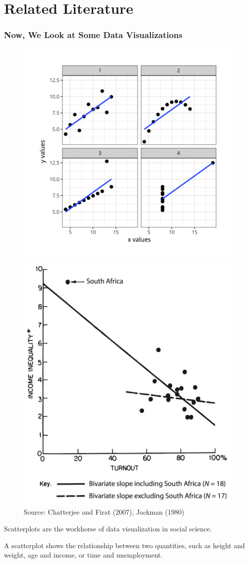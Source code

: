 \documentclass[11pt]{beamer}
\begin{document}
	\section[Literature]{Related Literature}
\begin{frame}

	\frametitle{\bfseries Now, We Look at Some Data Visualizations}
	\begin{figure}
		\vspace{-.5em}
		\includegraphics[width=0.5\linewidth]{Figure/anscombe-1}
		\includegraphics[width=0.4\linewidth]{Figure/jackman-outlier}
		\\
		\tiny{Source: Chatterjee and Firat (2007), Jackman (1980)}
		\label{fig:anscombe-1}
	\end{figure}
	\begin{itemize}
		\footnotesize{
		\item Scatterplots are the workhorse of data visualization in social science.
		\item A scatterplot shows the relationship between two quantities, such as height and weight, age and income, or time and unemployment. }
	\end{itemize}
\end{frame}
\end{document}

